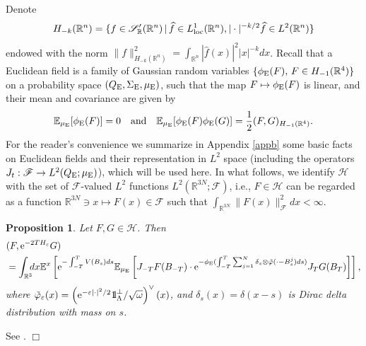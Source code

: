 \documentclass[11pt]{article}
\newtheorem{proposition}[theorem]{Proposition}
\providecommand{\bp}[1]{\begin{proposition}\label{#1}}
\providecommand{\ep}{\end{proposition}}
\def\bbbone{{\mathchoice {\rm 1\mskip-4mu l} {\rm 1\mskip-4mu l}
{\rm 1\mskip-4.5mu l} {\rm 1\mskip-5mu l}}}
\def\one{\bbbone}
\providecommand{\idx}{\int_{\BR} \!\!\! dx}
\newcommand{\Ebb}{{\mathbb E}}
\renewcommand{\d}{\displaystyle}
\providecommand{\qed}{\hfill {$\Box$}\par\medskip}
\providecommand{\BR}{{\mathbb{R}^3 }}
\providecommand{\RR}{\mathbb{R}}
\providecommand{\ms}[1]{\mathscr{#1}}
\providecommand{\fff}{\mathscr{F}}
\providecommand{\lk}{\left(}
\providecommand{\rk}{\right)}
\providecommand{\half}{\frac{1}{2}}
\providecommand{\La}{{\Lambda}}
\providecommand{\hhh}{\ms H} %
\providecommand{\non}{\nonumber}
\providecommand{\e}{{\rm e}}
\providecommand{\1}{\mathbb{1}}
\providecommand{\eps}{\varepsilon}
\begin{document}
Denote
$$
H_{-k}(\RR^n)=\{f\in \ms S_\RR'(\RR^n)\,|\,\widehat f\in L_{\rm loc}^1(\RR^n), |\cdot|^{-k/2}\widehat f\in
L^2(\RR^n)\}
$$
endowed with the norm $\d \|f\|_{H_{-k}(\RR^n)}^2=\int_{\RR^n} |\widehat f(x)|^2|x|^{-k} dx$. Recall that a
Euclidean field is a family of Gaussian random variables $\{\phi_{\rm E}(F), \, F\in H_{-1}(\RR^4)\}$ on a
probability space $(Q_{\rm E}, \Sigma_{\rm E}, \mu_{\rm E})$, such that the map $F \mapsto \phi_{\rm E}(F)$
is linear, and their mean and covariance are given by
$$
\Ebb_{\mu_{\rm E}}[\phi_{\rm E}(F)]=0 \quad \mbox{and} \quad \Ebb_{\mu_{\rm E}}[\phi_{\rm E}(F)
\phi_{\rm E}(G)]=\half (F,G)_{H_{-1}(\RR^4)}.
$$
For the reader's convenience we summarize in  Appendix \ref{appb} some basic facts on Euclidean fields and
their representation in $L^2$ space (including the operators $J_t:\fff\to L^2(Q_{\rm E};\mu_{\rm E})$),
which will be used here. In what follows, we identify $\hhh$ with the set of $\fff$-valued $L^2$ functions
$L^2(\RR^{3N};\fff)$, i.e., $F\in \hhh$ can  be regarded as a function  $\RR^{3N}\ni x\mapsto F(x)\in \fff$
such that $\int_{\RR^{3N}}\|F(x)\|^2_\fff dx<\infty$.
\bp{FKF}
Let $F, G\in\hhh$. Then
\begin{align}
&(F, \e^{-2TH_\eps}G)\non\\
&\label{fkf}
=\idx  \Ebb^x \left[\e^{-\int_{-T}^T V(B_s) ds} \Ebb_{\mu_{\rm E}} \left[J_{-T} F(B_{-T})\cdot
\e^{-\phi_{\rm E}(\int_{-T}^T\sum_{j=1}^N \delta_s\otimes \tilde\varphi(\cdot-B_s^j) ds)} J_TG(B_T)\right]\right],
\end{align}
where $\tilde \varphi_\eps(x)=\lk \e^{-\eps|\cdot|^2/2}\one_\La^\perp /\sqrt{\omega}\rk^\vee{}(x)$, and $\delta_s(x) =
\delta(x-s)$ is Dirac delta distribution with mass on $s$.
\ep
\proof
See \cite[Theorem 6.3]{lhb11}.
\qed
\end{document}
